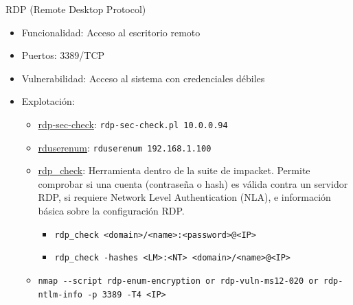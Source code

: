 \documentclass[aspectratio=169,11pt]{beamer}
\newcommand{\cmd}[1]{\texttt{#1}}
\begin{document}
\begin{frame}[allowframebreaks]{RDP (Remote Desktop Protocol)}
\small
  \begin{itemize}
  \item Funcionalidad: Acceso al escritorio remoto
  \item Puertos: 3389/TCP
  \item Vulnerabilidad: Acceso al sistema con credenciales débiles
  \item Explotación:
    \begin{itemize}
    \item \href{https://github.com/CiscoCXSecurity/rdp-sec-check}{rdp-sec-check}: \cmd{rdp-sec-check.pl 10.0.0.94}
    \item \href{https://github.com/skorov/rduserenum}{rduserenum}: \cmd{rduserenum 192.168.1.100}
    \item \href{https://github.com/fortra/impacket}{rdp\_check}: Herramienta dentro de la suite de impacket. Permite comprobar si una cuenta (contraseña o hash) es válida contra un servidor RDP, si requiere Network Level Authentication (NLA), e información básica sobre la configuración RDP.
    \begin{itemize}
    \item \cmd{rdp\_check <domain>/<name>:<password>@<IP>}
    \item \cmd{rdp\_check -hashes <LM>:<NT> <domain>/<name>@<IP>}
    \end{itemize}
    \item \cmd{nmap -{}-script \textquotedbl{}rdp-enum-encryption or rdp-vuln-ms12-020 or rdp-ntlm-info\textquotedbl{} -p 3389 -T4 <IP>}
    \end{itemize}
  \end{itemize}
\end{frame}

\end{document}
